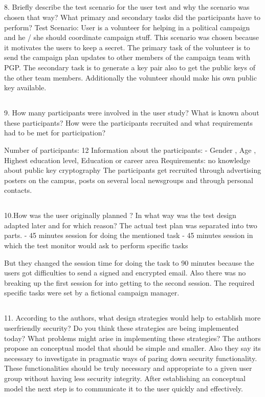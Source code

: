 \subsection{}
8. Briefly describe the test scenario for the user test and why the scenario was chosen that way? What primary and secondary tasks did the participants have to perform? 
Test Scenario: User is a volunteer for helping in a political campaign and  he / she should coordinate campaign stuff. This scenario was chosen because it motivates the users to keep a secret. 
The primary task of the volunteer is to send the campaign plan updates to other members of the campaign team with PGP. 
The secondary task is to generate a key pair also to get the public keys of the other team members. Additionally the volunteer should make his own public key available. 


\subsection{}
9. How many participants were involved in the user study? What is known about these participants? How were the participants recruited and what requirements had to be met for participation? 

Number of participants: 12
Information about the participants:
-	Gender , Age , Highest education level, Education or career area
Requirements: no knowledge about public key cryptography 
The participants get recruited through advertising posters on the campus, posts on several local newsgroups and through personal contacts. 

\subsection{}
10.How was the user originally planned ? In what way was the test design adapted later and for which reason?
The actual test plan was separated into two parts. 
-	45 minutes session for doing the mentioned task 
-	45 minutes session in which the test monitor would ask to perform specific tasks

But they changed the session time for doing the task to 90 minutes because the users got difficulties to send a signed and encrypted email. Also there was no breaking up the first session for into getting to the second session. The required specific tasks were set by a fictional campaign manager. 

\subsection{}
11. According to the authors, what design strategies would help to establish more userfriendly security? Do you think these strategies are being implemented today? What problems might arise in implementing these strategies?
The authors propose an conceptual model  that should be simple and smaller. Also they say its necessary to investigate in pragmatic ways of paring down security functionality. These functionalities should be truly necessary and appropriate to a given user group without having less security integrity. After establishing an conceptual model the next step is to communicate it to the user quickly and effectively. 

